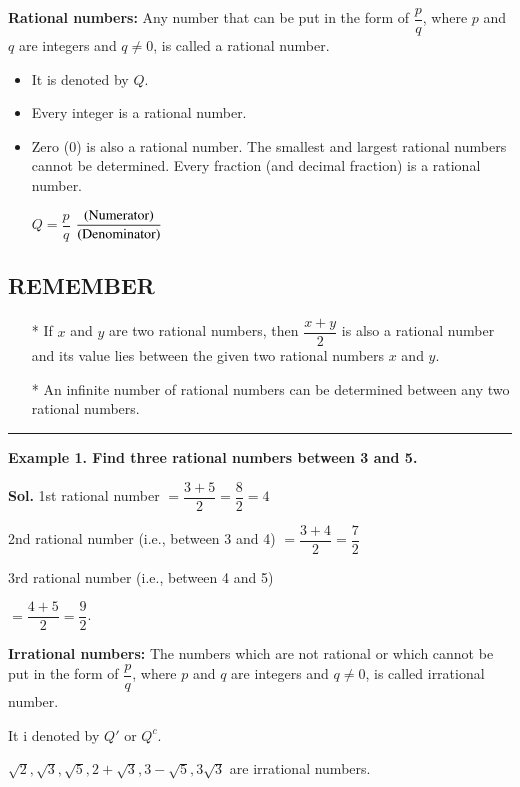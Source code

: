 \begin{multicols}{2}
\textbf{Rational numbers:} Any number that can be put in the form of $\dfrac{p}{q}$, where $p$ and $q$ are integers and $q \neq 0$, is called a rational number.
\begin{itemize}
\item It is denoted by $Q$.
\item Every integer is a rational number.
\item Zero (0) is also a rational number. The smallest and largest rational numbers cannot be determined. Every fraction (and decimal fraction) is a rational number.

$Q = \dfrac{p}{q}$ $\dfrac{(\rm Numerator)}{(\rm Denominator)}$
\end{itemize}

\subsection*{REMEMBER}

\begin{itemize}
\item[*] If $x$ and $y$ are two rational numbers, then $\dfrac{x + y}{2}$ is also a rational number and its value lies between the given two rational numbers $x$ and $y$.
\item[*] An infinite number of rational numbers can be determined between any two rational numbers.
\end{itemize}

\noindent
\rule{\columnwidth}{1pt}


\textbf{Example 1. Find three rational numbers between 3 and 5.}

\textbf{Sol.} 1st rational number $= \dfrac{3+5}{2} = \dfrac{8}{2} = 4$

  2nd rational number (i.e., between 3 and 4) $= \dfrac{3+4}{2} = \dfrac{7}{2}$

  3rd rational number (i.e., between 4 and 5)

  $= \dfrac{4+5}{2} = \dfrac{9}{2}$.

  \textbf{Irrational numbers:} The numbers which are not rational or which cannot be put in the form of $\dfrac{p}{q}$, where $p$ and $q$ are integers and $q \neq 0$, is called irrational number.

  It i denoted by $Q'$ or $Q^{c}$.

  $\sqrt{2}, \sqrt{3}, \sqrt{5}, 2 + \sqrt{3}, 3 -\sqrt{5}, 3\sqrt{3}$ are irrational numbers.




\end{multicols}
